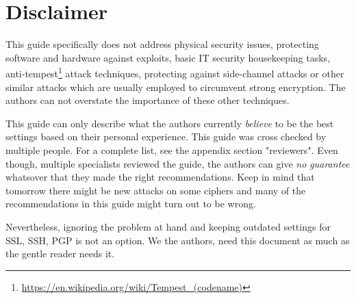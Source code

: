 \section{Disclaimer}
This guide specifically does not address physical security issues, protecting software and hardware against exploits, basic IT security housekeeping tasks, anti-tempest\footnote{\url{https://en.wikipedia.org/wiki/Tempest\_(codename)}} attack techniques, protecting against side-channel attacks or other similar attacks which are usually employed to circumvent strong encryption. The authors can not overstate the importance of these other techniques. 

This guide can only describe what the authors currently \emph{believe} to be the best settings based on their personal experience. This guide was cross checked by multiple people. For a complete list, see the appendix section "reviewers". Even though, multiple specialists reviewed the guide, the authors can give \emph{no guarantee} whatsover that they made the right recommendations. Keep in mind that tomorrow there might be new attacks on some ciphers and many of the recommendations in this guide might turn out to be wrong.



Nevertheless, ignoring the problem at hand and keeping outdated settings for SSL, SSH, PGP is not an option. We the authors, need this document as much as the gentle reader needs it.


